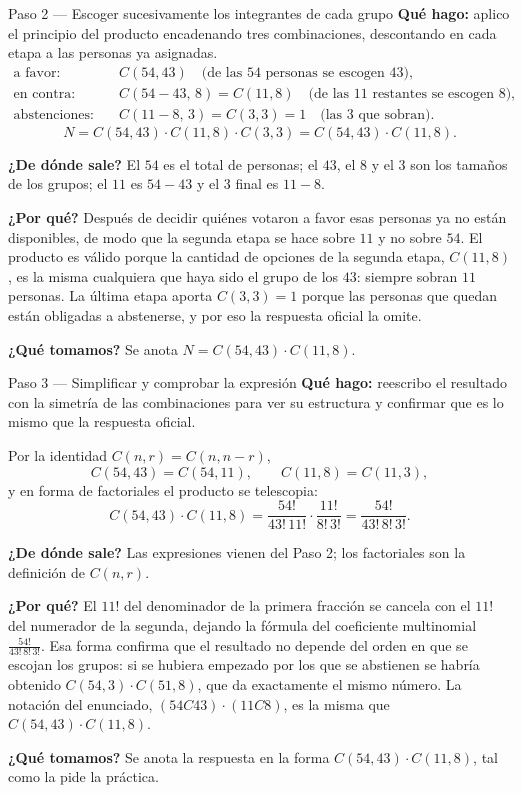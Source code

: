 \documentclass[11pt]{article}
\begin{document}
\begin{paso}{Paso 2 --- Escoger sucesivamente los integrantes de cada grupo}
\textbf{Qué hago:} aplico el principio del producto encadenando tres combinaciones, descontando en cada etapa a las personas ya asignadas.
\begin{align*}
  \text{a favor:}&\quad C(54,43) \quad \text{(de las 54 personas se escogen 43)},\\
  \text{en contra:}&\quad C(54-43,\,8)=C(11,8) \quad \text{(de las 11 restantes se escogen 8)},\\
  \text{abstenciones:}&\quad C(11-8,\,3)=C(3,3)=1 \quad \text{(las 3 que sobran)} .
\end{align*}
\[
  N = C(54,43)\cdot C(11,8)\cdot C(3,3)= C(54,43)\cdot C(11,8) .
\]

\textbf{¿De dónde sale?} El $54$ es el total de personas; el $43$, el $8$ y el $3$ son los tamaños de los grupos; el $11$ es $54-43$ y el $3$ final es $11-8$.

\textbf{¿Por qué?} Después de decidir quiénes votaron a favor esas personas ya no están disponibles, de modo que la segunda etapa se hace sobre $11$ y no sobre $54$. El producto es válido porque la cantidad de opciones de la segunda etapa, $C(11,8)$, es la misma cualquiera que haya sido el grupo de los $43$: siempre sobran $11$ personas. La última etapa aporta $C(3,3)=1$ porque las personas que quedan están obligadas a abstenerse, y por eso la respuesta oficial la omite.

\textbf{¿Qué tomamos?} Se anota $N=C(54,43)\cdot C(11,8)$.
\end{paso}

\begin{paso}{Paso 3 --- Simplificar y comprobar la expresión}
\textbf{Qué hago:} reescribo el resultado con la simetría de las combinaciones para ver su estructura y confirmar que es lo mismo que la respuesta oficial.

Por la identidad $C(n,r)=C(n,n-r)$,
\[
  C(54,43)=C(54,11),\qquad C(11,8)=C(11,3),
\]
y en forma de factoriales el producto se telescopia:
\[
  C(54,43)\cdot C(11,8)=\frac{54!}{43!\,11!}\cdot\frac{11!}{8!\,3!}=\frac{54!}{43!\,8!\,3!} .
\]

\textbf{¿De dónde sale?} Las expresiones vienen del Paso 2; los factoriales son la definición de $C(n,r)$.

\textbf{¿Por qué?} El $11!$ del denominador de la primera fracción se cancela con el $11!$ del numerador de la segunda, dejando la fórmula del coeficiente multinomial $\frac{54!}{43!\,8!\,3!}$. Esa forma confirma que el resultado no depende del orden en que se escojan los grupos: si se hubiera empezado por los que se abstienen se habría obtenido $C(54,3)\cdot C(51,8)$, que da exactamente el mismo número. La notación del enunciado, $(54C43)\cdot(11C8)$, es la misma que $C(54,43)\cdot C(11,8)$.

\textbf{¿Qué tomamos?} Se anota la respuesta en la forma $C(54,43)\cdot C(11,8)$, tal como la pide la práctica.
\end{paso}
\end{document}
